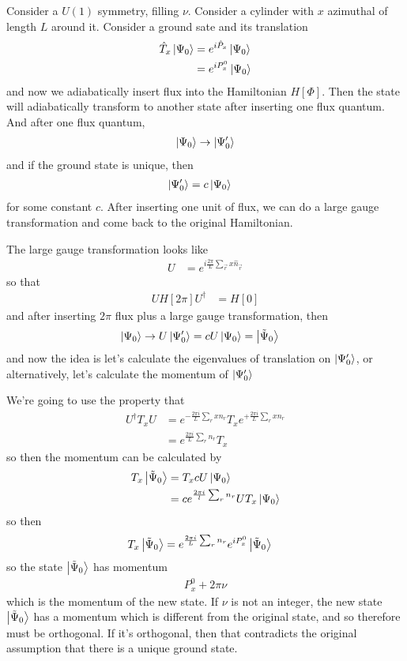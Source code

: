 Consider a $U(1)$ symmetry,
filling $\nu$.
Consider a cylinder with $x$ azimuthal of length $L$ around it.
Consider a ground sate and its translation
\begin{align}
    \hat{T}_x\ket{\Psi_0}
    &=
    e^{i\hat{P}_x}\ket{\Psi_0}\\
    &=
    e^{iP_x^0} \ket{\Psi_0}
\end{align}
and now we adiabatically insert flux into the Hamiltonian $H[\Phi]$.
Then the state will adiabatically transform to another state after inserting one
flux quantum.
And after one flux quantum,
\begin{align}
    \ket{\Psi_0} \to \ket{\Psi_0'}
\end{align}
and if the ground state is unique,
then
\begin{align}
    \ket{\Psi_0'} &= c \ket{\Psi_0}
\end{align}
for some constant $c$.
After inserting one unit of flux,
we can do a large gauge transformation and come back to the original
Hamiltonian.

The large gauge transformation looks like
\begin{align}
    U &=
    e^{i \frac{2\pi}{L} \sum_{\vec{r}} x \hat{n}_{\vec{r}}}
\end{align}
so that
\begin{align}
    U H[2\pi] U^\dagger &= H[0]
\end{align}
and after inserting $2\pi$ flux plus a large gauge transformation,
then
\begin{align}
    \ket{\Psi_0} &\to U\ket{\Psi_0'}
    = cU \ket{\Psi_0} = \ket{\tilde{\Psi}_0}
\end{align}
and now the idea is let's calculate the eigenvalues of translation on
$\ket{\Psi_0'}$,
or alternatively,
let's calculate the momentum of $\ket{\Psi_0'}$

We're going to use the property that
\begin{align}
    U^\dagger T_x U &=
    e^{-\frac{2\pi i}{L} \sum_r x n_r} T_x
    e^{+ \frac{2\pi i}{L} \sum_r x n_r}\\
    &=
    e^{\frac{2\pi i}{L} \sum_r n_r} T_x
\end{align}
so then the momentum can be calculated by
\begin{align}
    T_x \ket{\tilde{\Psi}_0 }
    &=
    T_x c U\ket{\Psi_0}\\
    &=
    c e^{\frac{2\pi i}{l} \sum_r n_r}
    U T_x \ket{\Psi_0}
\end{align}
so then
\begin{align}
    T_x \ket{\tilde{\Psi}_0 }
    &=
    e^{\frac{2\pi i}{L} \sum_r n_r}
    e^{i P_x^0}
    \ket{\tilde{\Psi}_0}
\end{align}
so the state $\ket{\tilde{\Psi}_0}$ has momentum
\begin{align}
    P_x^0 + 2\pi \nu
\end{align}
which is the momentum of the new state.
If $\nu$ is not an integer,
the new state $\ket{\tilde{\Psi}_0}$ has a momentum which is different from the
original state, and so therefore must be orthogonal.
If it's orthogonal,
then that contradicts the original assumption that there is a unique ground
state.

